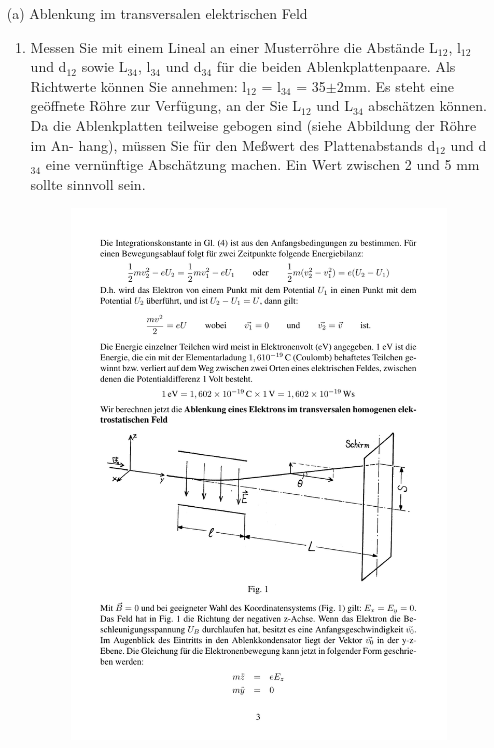\documentclass[12pt]{scrartcl}
\begin{document}
\begin{itemize}
\item[(a)] Ablenkung im transversalen elektrischen Feld
\newline
\begin{enumerate}
\item
Messen Sie mit einem Lineal an einer Musterröhre die Abstände
L$_{12}$, l$_{12}$ und d$_{12}$
sowie L$_{34}$, l$_{34}$ und d$_{34}$ für die beiden Ablenkplattenpaare. Als Richtwerte können Sie annehmen:
l$_{12}$ = l$_{34}$ = 35$\pm$2mm. Es steht eine geöffnete Röhre zur Verfügung,
an der Sie L$_{12}$ und L$_{34}$ abschätzen können.
Da die Ablenkplatten teilweise gebogen sind (siehe Abbildung der Röhre im An-
hang), müssen Sie für den Meßwert des Plattenabstands
d$_{12}$ und d$_{34}$ eine vernünftige Abschätzung machen. Ein Wert zwischen 2 und 5 mm sollte sinnvoll sein.
\begin{figure}[htbp] 
	  \centering
	    \includegraphics[trim = 1mm 61mm 1mm 85mm, clip, scale = 1]{E_ablenkung.pdf}

\end{figure}
\end{enumerate}
\end{itemize}
\end{document}
